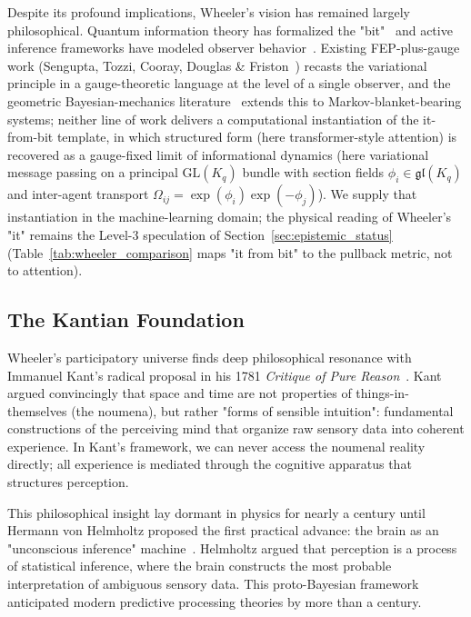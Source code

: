 \documentclass[11pt]{article}
\begin{document}
Despite its profound implications, Wheeler's vision has remained largely philosophical. Quantum information theory has formalized the "bit"~\cite{Shannon1948, CoverThomas2006} and active inference frameworks have modeled observer behavior~\cite{Friston2010, Friston2017}. Existing FEP-plus-gauge work (Sengupta, Tozzi, Cooray, Douglas \& Friston~\cite{Sengupta2016NeuronalGauge}) recasts the variational principle in a gauge-theoretic language at the level of a single observer, and the geometric Bayesian-mechanics literature~\cite{Sakthivadivel2022, KirchhoffParrPalaciosFristonKiverstein2018} extends this to Markov-blanket-bearing systems; neither line of work delivers a computational instantiation of the it-from-bit template, in which structured form (here transformer-style attention) is recovered as a gauge-fixed limit of informational dynamics (here variational message passing on a principal $\mathrm{GL}(K_q)$ bundle with section fields $\phi_i \in \mathfrak{gl}(K_q)$ and inter-agent transport $\Omega_{ij} = \exp(\phi_i)\exp(-\phi_j)$). We supply that instantiation in the machine-learning domain; the physical reading of Wheeler's "it" remains the Level-3 speculation of Section~\ref{sec:epistemic_status} (Table~\ref{tab:wheeler_comparison} maps "it from bit" to the pullback metric, not to attention).

\subsection{The Kantian Foundation}

Wheeler's participatory universe finds deep philosophical resonance with Immanuel Kant's radical proposal in his 1781 \emph{Critique of Pure Reason}~\cite{Kant1781}. Kant argued convincingly that space and time are not properties of things-in-themselves (the noumena), but rather "forms of sensible intuition": fundamental constructions of the perceiving mind that organize raw sensory data into coherent experience. In Kant's framework, we can never access the noumenal reality directly; all experience is mediated through the cognitive apparatus that structures perception.

This philosophical insight lay dormant in physics for nearly a century until Hermann von Helmholtz proposed the first practical advance: the brain as an "unconscious inference" machine~\cite{Helmholtz1867}. Helmholtz argued that perception is a process of statistical inference, where the brain constructs the most probable interpretation of ambiguous sensory data. This proto-Bayesian framework anticipated modern predictive processing theories by more than a century.
\end{document}
